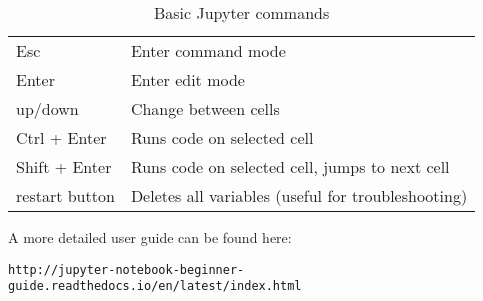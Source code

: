 \begin{table}[!h]
\begin{center}
\begin{tabular}{|l|l|}
\hline
Esc              & Enter command mode\\
Enter            & Enter edit mode\\
\hline
up/down          & Change between cells\\
Ctrl + Enter     & Runs code on selected cell\\
Shift + Enter    & Runs code on selected cell, jumps to next cell\\
\hline
restart button   & Deletes all variables (useful for troubleshooting)\\ 
\hline
\end{tabular}
\end{center}
\caption{\label{tb::jupyterbasiccommands}Basic Jupyter commands}
\end{table}

\noindent A more detailed user guide can be found here:

\begin{verbatim}
http://jupyter-notebook-beginner-guide.readthedocs.io/en/latest/index.html
\end{verbatim}
